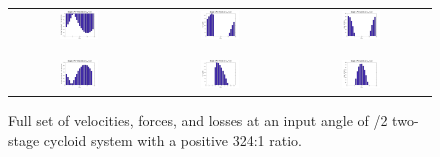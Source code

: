 \begin{figure}[h]
   \centering
   \begin{tabular}{ccc}
	   \includegraphics[width=0.30\textwidth]{fig/double_1_vel_pi_2} &
	   \includegraphics[width=0.30\textwidth]{fig/double_1_forces_pi_2} &
	   \includegraphics[width=0.30\textwidth]{fig/double_1_losses_pi_2} \\
	   \\
	   \hline
	   \\
	   \includegraphics[width=0.30\textwidth]{fig/double_2_vel_pi_2} &
	   \includegraphics[width=0.30\textwidth]{fig/double_2_forces_pi_2} &
	   \includegraphics[width=0.30\textwidth]{fig/double_2_losses_pi_2} \\
   \end{tabular}
   \caption{Full set of velocities, forces, and losses at an input angle of \textpi/2 two-stage cycloid system with a positive 324:1 ratio.}
   \label{fig:two_stage_forces_pos}
\end{figure}


